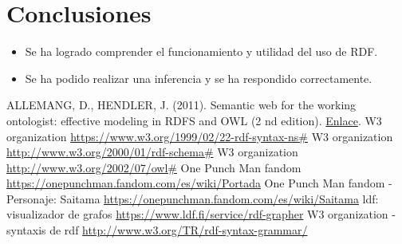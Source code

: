 \documentclass[conference]{IEEEtran}
\begin{document}

\section{Conclusiones}
    
    \begin{itemize}
        \item Se ha logrado comprender el funcionamiento y utilidad del uso de RDF.
        \item Se ha podido realizar una inferencia y se ha respondido correctamente.
    \end{itemize}




\begin{thebibliography}{00}
ALLEMANG, D., HENDLER, J. (2011). Semantic web for the working ontologist: effective modeling
in RDFS and OWL (2 nd edition). \href{https://doi.org/10.1016/C2010-0-68657-3}{Enlace}.
W3 organization \url{https://www.w3.org/1999/02/22-rdf-syntax-ns#}
W3 organization \url{http://www.w3.org/2000/01/rdf-schema#}
W3 organization \url{http://www.w3.org/2002/07/owl#}
One Punch Man fandom \url{https://onepunchman.fandom.com/es/wiki/Portada}
One Punch Man fandom - Personaje: Saitama \url{https://onepunchman.fandom.com/es/wiki/Saitama}
ldf: visualizador de grafos \url{https://www.ldf.fi/service/rdf-grapher}
W3 organization - syntaxis de rdf \url{http://www.w3.org/TR/rdf-syntax-grammar/}
\end{thebibliography}
\end{document}
